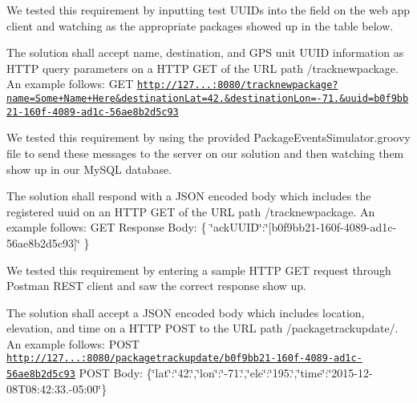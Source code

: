 \begin{DoxyEnumerate}
\begin{DoxyItemize}
\item We tested this requirement by inputting test U\+U\+I\+Ds into the field on the web app client and watching as the appropriate packages showed up in the table below.
\end{DoxyItemize}
\item The solution shall accept name, destination, and G\+PS unit U\+U\+ID information as H\+T\+TP query parameters on a H\+T\+TP G\+ET of the U\+RL path {\ttfamily /tracknewpackage}. An example follows\+: {\ttfamily G\+ET \href{http://127.0.0.1:8080/tracknewpackage?name=Some+Name+Here&destinationLat=42.4877185&destinationLon=-71.8249125&uuid=b0f9bb21-160f-4089-ad1c-56ae8b2d5c93}{\tt http\+://127...\+:8080/tracknewpackage?name=\+Some+\+Name+\+Here\&destination\+Lat=42.\&destination\+Lon=-\/71.\&uuid=b0f9bb21-\/160f-\/4089-\/ad1c-\/56ae8b2d5c93}}
\begin{DoxyItemize}
\item We tested this requirement by using the provided {\ttfamily Package\+Events\+Simulator.\+groovy} file to send these messages to the server on our solution and then watching them show up in our My\+S\+QL database.
\end{DoxyItemize}
\item The solution shall respond with a J\+S\+ON encoded body which includes the registered uuid on an H\+T\+TP G\+ET of the U\+RL path {\ttfamily /tracknewpackage}. An example follows\+: {\ttfamily G\+ET Response Body\+: \{ \char`\"{}ack\+U\+U\+I\+D\char`\"{}\+:\char`\"{}\mbox{[}b0f9bb21-\/160f-\/4089-\/ad1c-\/56ae8b2d5c93\mbox{]}\char`\"{} \}}
\begin{DoxyItemize}
\item We tested this requirement by entering a sample H\+T\+TP G\+ET request through Postman R\+E\+ST client and saw the correct response show up.
\end{DoxyItemize}
\item The solution shall accept a J\+S\+ON encoded body which includes location, elevation, and time on a H\+T\+TP P\+O\+ST to the U\+RL path {\ttfamily /packagetrackupdate/}. An example follows\+: {\ttfamily P\+O\+ST \href{http://127.0.0.1:8080/packagetrackupdate/b0f9bb21-160f-4089-ad1c-56ae8b2d5c93}{\tt http\+://127...\+:8080/packagetrackupdate/b0f9bb21-\/160f-\/4089-\/ad1c-\/56ae8b2d5c93}} {\ttfamily P\+O\+ST Body\+: \{\char`\"{}lat\char`\"{}\+:\char`\"{}42.\char`\"{},\char`\"{}lon\char`\"{}\+:\char`\"{}-\/71.\char`\"{},\char`\"{}ele\char`\"{}\+:\char`\"{}195.\char`\"{},\char`\"{}time\char`\"{}\+:\char`\"{}2015-\/12-\/08\+T08\+:42\+:33.-\/05\+:00\char`\"{}\}}

\end{DoxyEnumerate}
